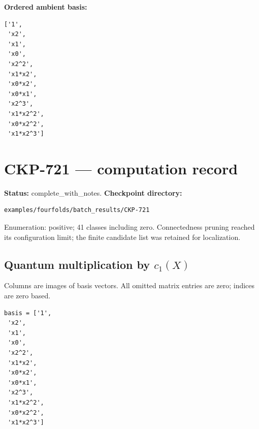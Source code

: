 \documentclass[10pt,a4paper]{article}
\begin{document}
\textbf{Ordered ambient basis:}
\begin{lstlisting}
['1',
 'x2',
 'x1',
 'x0',
 'x2^2',
 'x1*x2',
 'x0*x2',
 'x0*x1',
 'x2^3',
 'x1*x2^2',
 'x0*x2^2',
 'x1*x2^3']
\end{lstlisting}

\clearpage\section*{CKP-721 --- computation record}
\textbf{Status:} complete\_with\_notes.
\textbf{Checkpoint directory:}
\begin{lstlisting}
examples/fourfolds/batch_results/CKP-721
\end{lstlisting}

Enumeration: positive; 41 classes including zero.
Connectedness pruning reached its configuration limit; the finite candidate list was retained for localization.
\subsection*{Quantum multiplication by $c_1(X)$}
Columns are images of basis vectors. All omitted matrix entries are zero; indices are zero based.

\begin{lstlisting}
basis = ['1',
 'x2',
 'x1',
 'x0',
 'x2^2',
 'x1*x2',
 'x0*x2',
 'x0*x1',
 'x2^3',
 'x1*x2^2',
 'x0*x2^2',
 'x1*x2^3']
\end{lstlisting}
\end{document}
